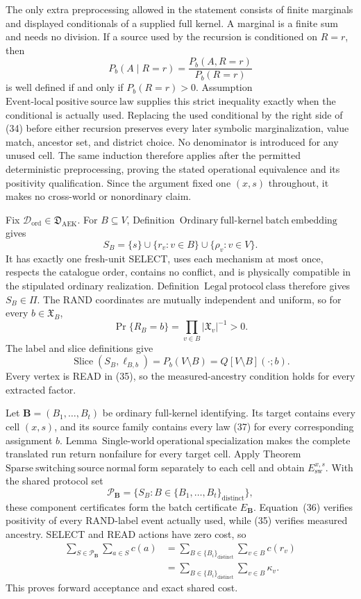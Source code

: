 The only extra preprocessing allowed in the statement consists of finite marginals and displayed conditionals of a supplied full kernel.  A marginal is a finite sum and needs no division.  If a source used by the recursion is conditioned on \(R=r\), then
\[
 P_b(A\mid R=r)
 =\frac{P_b(A,R=r)}{P_b(R=r)}
 \tag{34}
\]
is well defined if and only if \(P_b(R=r)>0\).  Assumption~\(\mathrm{Event\mbox{-}local\ positive\ source\ law}\) supplies this strict inequality exactly when the conditional is actually used.  Replacing the used conditional by the right side of (34) before either recursion preserves every later symbolic marginalization, value match, ancestor set, and district choice.  No denominator is introduced for any unused cell.  The same induction therefore applies after the permitted deterministic preprocessing, proving the stated operational equivalence and its positivity qualification.  Since the argument fixed one \((x,s)\) throughout, it makes no cross-world or nonordinary claim.

Fix \(\mathcal D_{\mathrm{ord}}\in\mathfrak D_{\mathrm{AEK}}\).  For \(B\subseteq V\), Definition~\(\mathrm{Ordinary\ full\mbox{-}kernel\ batch\ embedding}\) gives
\[
 S_B=\{s\}\cup\{r_v:v\in B\}\cup\{\rho_v:v\in V\}.
 \tag{35}
\]
It has exactly one fresh-unit SELECT, uses each mechanism at most once, respects the catalogue order, contains no conflict, and is physically compatible in the stipulated ordinary realization.  Definition~\(\mathrm{Legal\ protocol\ class}\) therefore gives \(S_B\in\Pi\).  The RAND coordinates are mutually independent and uniform, so for every \(b\in\mathfrak X_B\),
\[
 \Pr\{R_B=b\}=\prod_{v\in B}|\mathfrak X_v|^{-1}>0.
 \tag{36}
\]
The label and slice definitions give
\[
 \operatorname{Slice}(S_B,\ell_{B,b})
 =P_b(V\setminus B)=Q[V\setminus B](\cdot;b).
 \tag{37}
\]
Every vertex is READ in (35), so the measured-ancestry condition holds for every extracted factor.

Let \(\mathbf B=(B_1,\ldots,B_t)\) be ordinary full-kernel identifying.  Its target contains every cell \((x,s)\), and its source family contains every law (37) for every corresponding assignment \(b\).  Lemma~\(\mathrm{Single\mbox{-}world\ operational\ specialization}\) makes the complete translated run return nonfailure for every target cell.  Apply Theorem~\(\mathrm{Sparse\ switching\ source\ normal\ form}\) separately to each cell and obtain \(E_{\mathrm{sw}}^{x,s}\).  With the shared protocol set
\[
 \mathcal P_{\mathbf B}
 =\{S_B:B\in\{B_1,\ldots,B_t\}_{\mathrm{distinct}}\},
 \tag{38}
\]
these component certificates form the batch certificate \(E_{\mathbf B}\).  Equation~(36) verifies positivity of every RAND-label event actually used, while (35) verifies measured ancestry.  SELECT and READ actions have zero cost, so
\[
\begin{aligned}
 \sum_{S\in\mathcal P_{\mathbf B}}\sum_{a\in S}c(a)
 &=\sum_{B\in\{B_i\}_{\mathrm{distinct}}}\sum_{v\in B}c(r_v)\\
 &=\sum_{B\in\{B_i\}_{\mathrm{distinct}}}\sum_{v\in B}\kappa_v.
\end{aligned}
\tag{39}
\]
This proves forward acceptance and exact shared cost.

